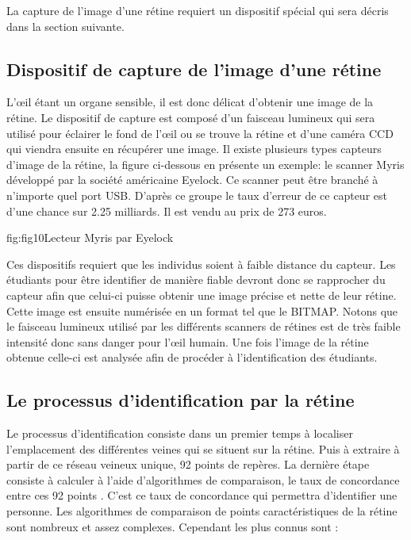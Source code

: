 \documentclass[overfullbox]{polytech/polytech}
\begin{document}
La capture de l'image d'une rétine requiert un dispositif spécial qui sera décris dans la section suivante.

\subsection{Dispositif de capture de l’image d’une rétine}
L'œil étant un organe sensible, il est donc délicat d'obtenir une image de la rétine. Le dispositif de capture est composé d'un faisceau lumineux qui sera utilisé pour éclairer le fond de l'œil ou se trouve la rétine et d'une caméra CCD qui viendra ensuite en récupérer une image. Il existe plusieurs types capteurs d'image de la rétine, la figure ci-dessous en présente un exemple: le scanner Myris développé par la société américaine Eyelock. Ce scanner peut être branché à n'importe quel port USB. D'après ce groupe le taux d'erreur de ce capteur est d'une chance sur 2.25 milliards. Il est vendu au prix de 273 euros.

\begin{Figure}{fig:fig10}{Lecteur Myris par Eyelock}
\end{Figure}


Ces dispositifs requiert que les individus soient à faible distance du capteur. Les étudiants pour être identifier de manière fiable devront donc se rapprocher du capteur afin que celui-ci puisse obtenir une image précise et nette de leur rétine. Cette image est ensuite numérisée en un format tel que le BITMAP. Notons que le faisceau lumineux utilisé par les différents scanners de rétines est de très faible intensité donc sans danger pour l'œil humain. Une fois l'image de la rétine obtenue celle-ci est analysée afin de procéder à l'identification des étudiants.

\subsection{Le processus d'identification par la rétine}
Le processus d'identification consiste dans un premier temps à localiser l'emplacement des différentes veines qui se situent sur la rétine. Puis à extraire à partir de ce réseau veineux unique, 92 points de repères. La dernière étape consiste à calculer à l'aide d'algorithmes de comparaison, le taux de concordance entre ces 92 points . C'est ce taux de concordance qui permettra d'identifier une personne. Les algorithmes de comparaison de points caractéristiques de la rétine sont nombreux et assez complexes. Cependant les plus connus sont : 
 
\end{document}

